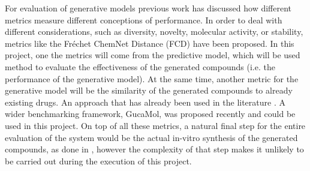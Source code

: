 \documentclass{article}
\begin{document}
For evaluation of generative models previous work \cite{Theis2016} has discussed how
different metrics measure different conceptions of performance. In order to deal with
different considerations, such as diversity, novelty, molecular activity, or stability,
metrics like the Fréchet ChemNet Distance (FCD) \cite{Preuer} have been proposed. In
this project, one the metrics will come from the predictive model, which will be used
method to evaluate the effectiveness of the generated compounds (i.e. the performance of
the generative model). At the same time, another metric for the generative model will be
the similarity of the generated compounds to already existing drugs. An approach that
has already been used in the literature \cite{Born2019}. A wider benchmarking framework,
GucaMol, was proposed recently \cite{Brown2019} and could be used in this project. On
top of all these metrics, a natural final step for the entire evaluation of the system
would be the actual in-vitro synthesis of the generated compounds, as done in
\cite{Zhavoronkov2019}, however the complexity of that step makes it unlikely to be
carried out during the execution of this project. 









    
\end{document}
